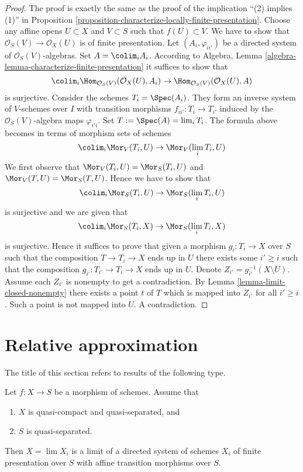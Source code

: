 \begin{proof}
The proof is exactly the same as the proof of the implication
``(2) implies (1)'' in
Proposition \ref{proposition-characterize-locally-finite-presentation}.
Choose any affine opens $U \subset X$ and $V \subset S$ such that
$f(U) \subset V$. We have to show that
$\mathcal{O}_S(V) \to \mathcal{O}_X(U)$ is of finite presentation.
Let $(A_i, \varphi_{ii'})$ be a directed system of
$\mathcal{O}_S(V)$-algebras. Set $A = \colim_i A_i$.
According to
Algebra, Lemma \ref{algebra-lemma-characterize-finite-presentation}
it suffices to show that
$$
\colim_i \Hom_{\mathcal{O}_S(V)}(\mathcal{O}_X(U), A_i) \to
\Hom_{\mathcal{O}_S(V)}(\mathcal{O}_X(U), A)
$$
is surjective. Consider the schemes $T_i = \Spec(A_i)$. They
form an inverse system of $V$-schemes over $I$
with transition morphisms $f_{ii'} : T_i \to T_{i'}$
induced by the $\mathcal{O}_S(V)$-algebra maps $\varphi_{i'i}$.
Set $T := \Spec(A) = \lim_i T_i$.
The formula above becomes in terms of morphism sets of schemes
$$
\colim_i \Mor_V(T_i, U) \to \Mor_V(\lim_i T_i, U)
$$
We first observe that
$\Mor_V(T_i, U) = \Mor_S(T_i, U)$
and
$\Mor_V(T, U) = \Mor_S(T, U)$.
Hence we have to show that
$$
\colim_i \Mor_S(T_i, U) \to
\Mor_S(\lim_i T_i, U)
$$
is surjective and we are given that
$$
\colim_i \Mor_S(T_i, X) \to
\Mor_S(\lim_i T_i, X)
$$
is surjective.
Hence it suffices to prove that given a morphism $g_i : T_i \to X$ over $S$
such that the composition $T \to T_i \to X$ ends up in $U$ there exists some
$i' \geq i$ such that the composition $g_{i'} : T_{i'} \to T_i \to X$ ends up
in $U$. Denote $Z_{i'} = g_{i'}^{-1}(X \setminus U)$.
Assume each $Z_{i'}$ is nonempty
to get a contradiction. By Lemma \ref{lemma-limit-closed-nonempty}
there exists a point $t$ of $T$ which is mapped into $Z_{i'}$ for all
$i' \geq i$. Such a point is not mapped into $U$. A contradiction.
\end{proof}








\section{Relative approximation}
\label{section-relative-approximation}

\noindent
The title of this section refers to results of the following type.

\begin{lemma}
\label{lemma-relative-approximation}
Let $f : X \to S$ be a morphism of schemes. Assume that
\begin{enumerate}
\item $X$ is quasi-compact and quasi-separated, and
\item $S$ is quasi-separated.
\end{enumerate}
Then $X = \lim X_i$ is a limit of a directed system of schemes
$X_i$ of finite presentation over $S$ with affine transition morphisms
over $S$.
\end{lemma}

